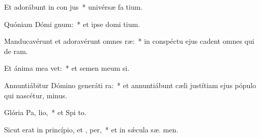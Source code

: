 \item Et adorábunt in con jus~* univérsæ fa tium.
\item Quóniam Dómi  gnum:~* et ipse domi tium.
\item Manducavérunt et adoravérunt omnes  ræ:~* in conspéctu ejus cadent omnes qui de  ram.
\item Et ánima mea  vet:~* et semen meum  si.
\item Annuntiábitur Dómino generáti ra:~* et annuntiábunt cæli justítiam ejus pópulo qui nascétur,   minus.
\item Glória Pa,  lio,~* et Spi to.
\item Sicut erat in princípio, et ,  per,~* et in sǽcula sæ. men.
